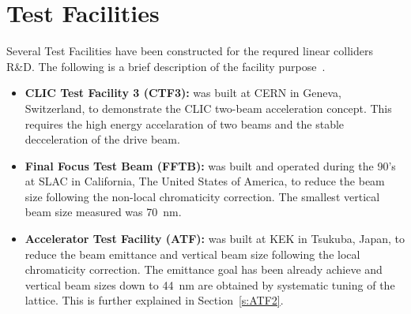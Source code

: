 \section{Test Facilities}
Several Test Facilities have been constructed for the requred linear colliders R\&D. The following is a brief description of the facility purpose~\cite{GarciaMorales:1982827}.\par
\begin{itemize}
 \item \textbf{CLIC Test Facility 3 (CTF3):} was built at CERN in Geneva, Switzerland, to demonstrate the CLIC two-beam acceleration concept. This requires the high energy accelaration of two beams and the stable decceleration of the drive beam. 
 \item \textbf{Final Focus Test Beam (FFTB):} was built and operated during the 90's at SLAC in California, The United States of America, to reduce the beam size following the non-local chromaticity correction. The smallest vertical beam size measured was 70~nm.
 \item \textbf{Accelerator Test Facility (ATF):} was built at KEK in Tsukuba, Japan, to reduce the beam emittance and vertical  beam size following the local chromaticity correction. The emittance goal has been already achieve and vertical beam sizes down to 44~nm are obtained by systematic tuning of the lattice. This is further explained in Section~\ref{s:ATF2}.
\end{itemize}
